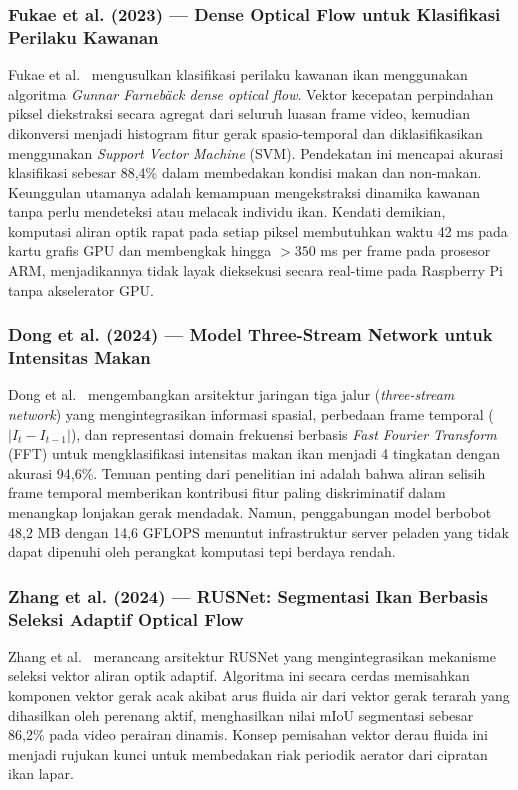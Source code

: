 \subsubsection{Fukae et al. (2023) --- Dense Optical Flow untuk Klasifikasi Perilaku Kawanan}
Fukae et al.~\cite{Fukae2023} mengusulkan klasifikasi perilaku kawanan ikan menggunakan algoritma \textit{Gunnar Farnebäck dense optical flow}. Vektor kecepatan perpindahan piksel diekstraksi secara agregat dari seluruh luasan frame video, kemudian dikonversi menjadi histogram fitur gerak spasio-temporal dan diklasifikasikan menggunakan \textit{Support Vector Machine} (SVM). Pendekatan ini mencapai akurasi klasifikasi sebesar 88,4\% dalam membedakan kondisi makan dan non-makan. Keunggulan utamanya adalah kemampuan mengekstraksi dinamika kawanan tanpa perlu mendeteksi atau melacak individu ikan. Kendati demikian, komputasi aliran optik rapat pada setiap piksel membutuhkan waktu 42 ms pada kartu grafis GPU dan membengkak hingga $>350$ ms per frame pada prosesor ARM, menjadikannya tidak layak dieksekusi secara real-time pada Raspberry Pi tanpa akselerator GPU.

\subsubsection{Dong et al. (2024) --- Model Three-Stream Network untuk Intensitas Makan}
Dong et al.~\cite{Dong2024} mengembangkan arsitektur jaringan tiga jalur (\textit{three-stream network}) yang mengintegrasikan informasi spasial, perbedaan frame temporal ($|I_t - I_{t-1}|$), dan representasi domain frekuensi berbasis \textit{Fast Fourier Transform} (FFT) untuk mengklasifikasi intensitas makan ikan menjadi 4 tingkatan dengan akurasi 94,6\%. Temuan penting dari penelitian ini adalah bahwa aliran selisih frame temporal memberikan kontribusi fitur paling diskriminatif dalam menangkap lonjakan gerak mendadak. Namun, penggabungan model berbobot 48,2 MB dengan 14,6 GFLOPS menuntut infrastruktur server peladen yang tidak dapat dipenuhi oleh perangkat komputasi tepi berdaya rendah.

\subsubsection{Zhang et al. (2024) --- RUSNet: Segmentasi Ikan Berbasis Seleksi Adaptif Optical Flow}
Zhang et al.~\cite{Zhang2024} merancang arsitektur RUSNet yang mengintegrasikan mekanisme seleksi vektor aliran optik adaptif. Algoritma ini secara cerdas memisahkan komponen vektor gerak acak akibat arus fluida air dari vektor gerak terarah yang dihasilkan oleh perenang aktif, menghasilkan nilai mIoU segmentasi sebesar 86,2\% pada video perairan dinamis. Konsep pemisahan vektor derau fluida ini menjadi rujukan kunci untuk membedakan riak periodik aerator dari cipratan ikan lapar.

